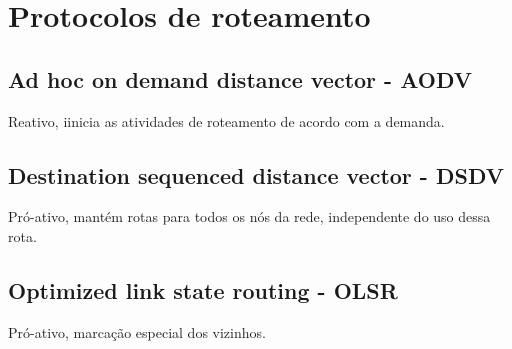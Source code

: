 \section{Protocolos de roteamento}


\subsection{Ad hoc on demand distance vector - AODV}
Reativo, iinicia as atividades de roteamento de acordo com a demanda.


\subsection{Destination sequenced distance vector - DSDV}
Pr\'o-ativo, mant\'em rotas para todos os n\'os da rede, independente do uso dessa rota.


\subsection{Optimized link state routing - OLSR}
Pr\'o-ativo, marca\c{c}\~ao especial dos vizinhos.

